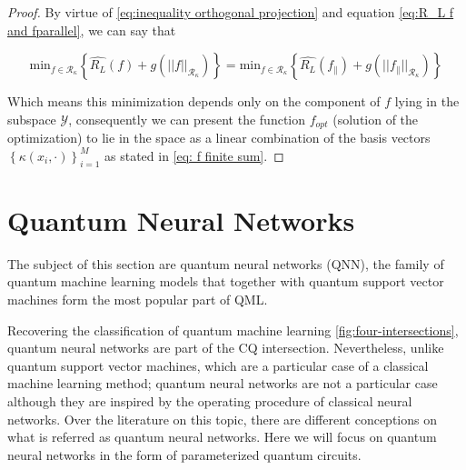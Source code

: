 \begin{proof}
     By virtue of \autoref{eq:inequality orthogonal projection} and equation \eqref{eq:R_L f and fparallel}, we can say that

     \begin{equation}
         \mathrm{min}_{f \in \mathcal{R}_{\kappa}} \left\lbrace \hat{R_L}(f) + g(||f||_{\mathcal{R}_{\kappa}}) \right\rbrace = 
         \mathrm{min}_{f \in \mathcal{R}_{\kappa}} \left\lbrace \hat{R_L}(f_{\parallel}) + g(||f_{\parallel}||_{\mathcal{R}_{\kappa}}) \right\rbrace 
     \end{equation}

    Which means this minimization depends only on the component of $f$ lying in the subspace $\mathcal{Y}$, consequently we can present the function $f_{opt}$ (solution of the optimization) to lie in the space as a linear combination of the basis vectors $\left \lbrace \kappa(x_i, \cdot) \right\rbrace_{i = 1}^{M}$ as stated in \eqref{eq: f finite sum}.
    
\end{proof}


\section{Quantum Neural Networks}
The subject of this section are quantum neural networks (QNN), the family of quantum machine learning models that together with quantum support vector machines form the most popular part of QML. 

Recovering the classification of quantum machine learning \autoref{fig:four-intersections}, quantum neural networks are part of the CQ intersection. Nevertheless, unlike quantum support vector machines, which are a particular case of a classical machine learning method; quantum neural networks are not a particular case although they are inspired by the operating procedure of classical neural networks. Over the literature on this topic, there are different conceptions on what is referred as quantum neural networks. Here we will focus on quantum neural networks in the form of parameterized quantum circuits.

